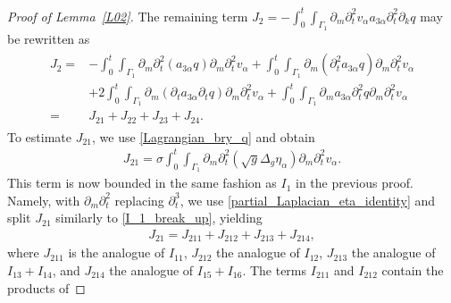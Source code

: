 \documentclass[10pt,reqno]{amsart}
\theoremstyle{plain}
\theoremstyle{definition}
\numberwithin{equation}{section}
\newcommand{\al}{\alpha}
\newcommand{\Ga}{\Gamma}
\newcommand{\si}{\sigma}
\begin{document}
\begin{proof}[Proof of Lemma~\ref{L02}]
The remaining
term 
$J_2
= 
-\int_{0}^{t}\int_{\Gamma_1}\partial_m\partial_{t}^2 v_{\alpha} a_{3\alpha}\partial_{t}^2\partial_{k}q
$
may be
rewritten as
\begin{align}
\begin{split}
J_2 = & 
- \int_0^t \int_{\Ga_1} \partial_m \partial^2_t (a_{3 \al} q) \partial_m \partial^2_t v_\al 
+\int_0^t \int_{\Ga_1} \partial_m (\partial^2_t a_{3\al} q ) \partial_m \partial^2_t v_\al 
\\
& 
+ 2\int_0^t \int_{\Ga_1} \partial_m (\partial_t a_{3\al} \partial_t q  )\partial_m \partial^2_t v_\al 
 + \int_0^t \int_{\Ga_1} \partial_m a_{3\al} \partial^2_t q \partial_m \partial^2_t v_\al 
 \\
 = &
 J_{21} + J_{22} + J_{23} + J_{24}.
\end{split}
\label{J_2_break_up}
\end{align}
To estimate $J_{21}$, we use \eqref{Lagrangian_bry_q} and obtain
\begin{gather}
J_{21} = \si\int_0^t \int_{\Ga_1} 
\partial_m \partial^2_t (\sqrt{g} \Delta_g \eta_\al ) \partial_m \partial^2_t v_\al .
\nonumber
\end{gather}
This term is now bounded in the same fashion as $I_{1}$ in 
the previous proof.
Namely, with $\partial_m \partial^2_t$ replacing $\partial^3_t$,
we use \eqref{partial_Laplacian_eta_identity} and split $J_{21}$ similarly to
\eqref{I_1_break_up}, yielding
\begin{gather}
J_{21} = J_{211} + J_{212} + J_{213} + J_{214},
\label{J_21_break_up}
\end{gather}
where $J_{211}$ is the analogue of $I_{11}$, $J_{212}$ the analogue of $I_{12}$,
$J_{213}$ the analogue of $I_{13}+I_{14}$, and $J_{214}$ the analogue of 
$I_{15}+I_{16}$. The terms $I_{211}$ and $I_{212}$ contain the products of

\end{proof}
\end{document}
